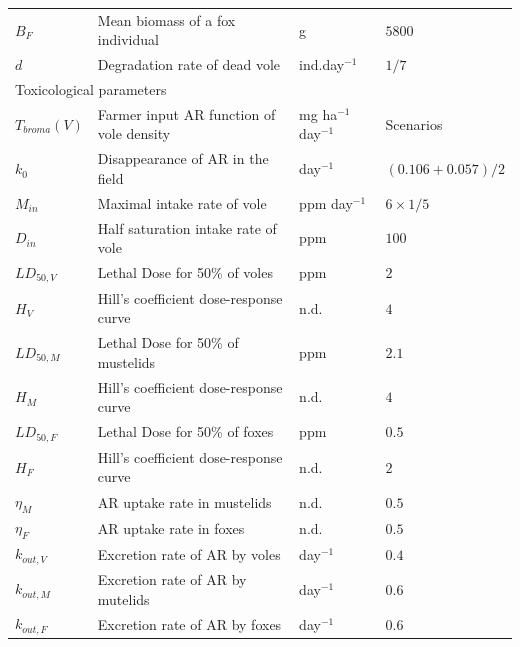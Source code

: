 \documentclass[11pt]{article}
\begin{document}
\begin{table}
\begin{tabular}{l p{7cm} l p{3cm}}
$B_F$ & Mean biomass of a fox individual & g & $5800$ \\
%
$d$ & Degradation rate of dead vole & ind.day$^{-1}$ & $1/7$ \\
%
\hline
\multicolumn{2}{l}{Toxicological parameters}  & & \\
\hline
%
$T_{broma}(V)$ & Farmer input AR function of vole density & mg ha$^{-1}$ day$^{-1}$ & Scenarios \\
$k_0$ & Disappearance of AR in the field & day$^{-1}$ & $(0.106+0.057)/2$ \\
%
%
$M_{in}$ & Maximal intake rate of vole & ppm day$^{-1}$ & $6\times 1/5$ \\
%
$D_{in}$ & Half saturation intake rate of vole & ppm & $100$\\
%
$LD_{50,V}$ & Lethal Dose for 50\% of voles & ppm & $2$ \\
$H_V$ & Hill's coefficient dose-response curve &  n.d. & $4$ \\
%
$LD_{50,M}$ & Lethal Dose for 50\% of mustelids & ppm & $2.1$ \\
$H_M$ & Hill's coefficient dose-response curve & n.d. & $4$  \\
%
$LD_{50,F}$ & Lethal Dose for 50\% of foxes & ppm & $0.5$\\
$H_F$ & Hill's coefficient dose-response curve & n.d. & $2$ \\
%
$\eta_M$ & AR uptake rate in mustelids & n.d. & $0.5$ \\
$\eta_F$ & AR uptake rate in foxes & n.d.& $0.5$\\
%
$k_{out,V}$ & Excretion rate of AR by voles & day$^{-1}$ & $0.4$\\
$k_{out,M}$ & Excretion rate of AR by mutelids & day$^{-1}$ & $0.6$\\
$k_{out,F}$ & Excretion rate of AR by foxes & day$^{-1}$ & $0.6$\\
%
\hline
\end{tabular}
\end{table}

\end{document}
